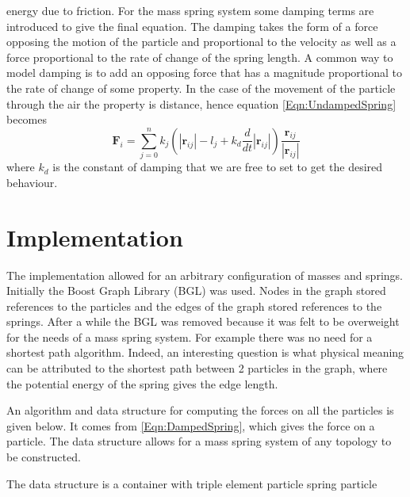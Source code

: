 energy due to friction. For the mass spring system some damping terms are
introduced to give the final equation. The damping takes the form of a force
opposing the motion of the particle and proportional to the velocity as well as
a force proportional to the rate of change of the spring length. A common way to
model damping is to add an opposing force that has a magnitude proportional to
the rate of change of some property. In the case of the movement of the particle
through the air the property is distance, hence equation \ref{Eqn:UndampedSpring}
becomes
\begin{equation}
    \label{Eqn:DampedSpring}
      \mathbf{F}_i = \sum_{j=0}^{n}k_j\left(\left|\mathbf{r}_{ij}\right|-l_j 
                    + k_d\frac{d}{dt}\left|\mathbf{r}_{ij}\right|\right)
                    \frac{\mathbf{r}_{ij}}{\left|\mathbf{r}_{ij}\right|} 
\end{equation}
where $k_d$ is the constant of damping that we are free to set to get the
desired behaviour.

\section{Implementation}
The implementation allowed for an arbitrary configuration of masses and springs.
Initially the Boost Graph Library (BGL) \cite{BGL} was used. Nodes in the graph
stored references to the particles and the edges of the graph stored references
to the springs. After a while the BGL was removed because it was felt to be
overweight for the needs of a mass spring system. For example there was no need
for a shortest path algorithm. Indeed, an interesting question is what physical
meaning can be attributed to the shortest path between 2 particles in the graph,
where the potential energy of the spring gives the edge length.

An algorithm and data structure for computing the forces on all the particles is
given below. It comes from \ref{Eqn:DampedSpring}, which gives the force on a
particle. The data structure allows for a mass spring system of any topology to
be constructed. 

The data structure is a container with triple element particle spring particle 

